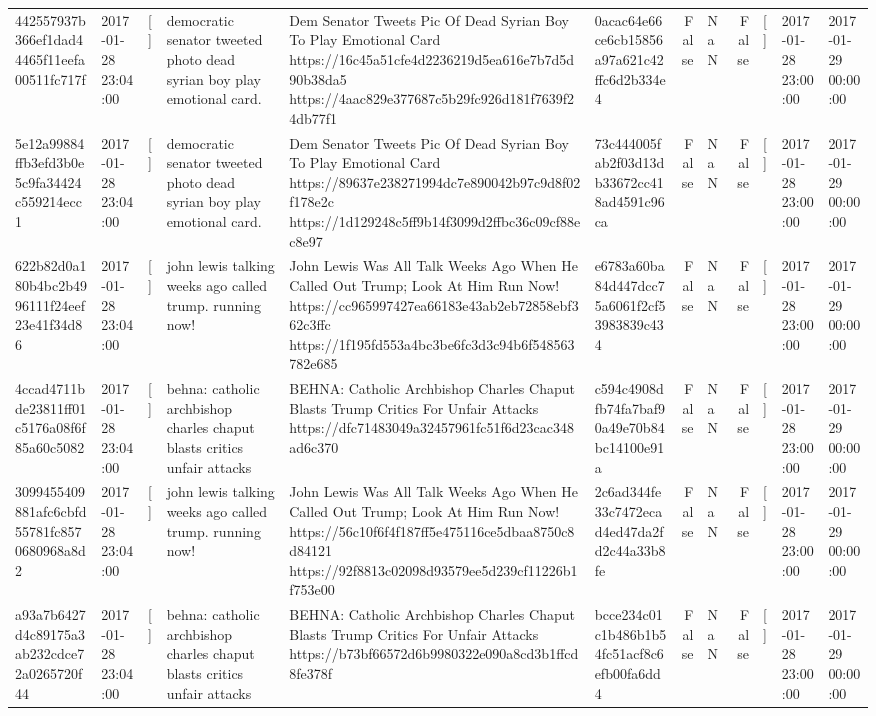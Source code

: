 \begin{tabular}{llllllrlrlll}
442557937b366ef1dad44465f11eefa00511fc717f & 2017-01-28 23:04:00 & [] & democratic senator tweeted photo dead syrian boy play emotional card. & Dem Senator Tweets Pic Of Dead Syrian Boy To Play Emotional Card https://16c45a51cfe4d2236219d5ea616e7b7d5d90b38da5 https://4aac829e377687c5b29fc926d181f7639f24db77f1 & 0acac64e66ce6cb15856a97a621c42ffc6d2b334e4 & False & NaN & False & [] & 2017-01-28 23:00:00 & 2017-01-29 00:00:00 \\
5e12a99884ffb3efd3b0e5c9fa34424c559214ecc1 & 2017-01-28 23:04:00 & [] & democratic senator tweeted photo dead syrian boy play emotional card. & Dem Senator Tweets Pic Of Dead Syrian Boy To Play Emotional Card https://89637e238271994dc7e890042b97c9d8f02f178e2c https://1d129248c5ff9b14f3099d2ffbc36c09cf88ec8e97 & 73c444005fab2f03d13db33672cc418ad4591c96ca & False & NaN & False & [] & 2017-01-28 23:00:00 & 2017-01-29 00:00:00 \\
622b82d0a180b4bc2b4996111f24eef23e41f34d86 & 2017-01-28 23:04:00 & [] & john lewis talking weeks ago called trump. running now! & John Lewis Was All Talk Weeks Ago When He Called Out Trump; Look At Him Run Now! https://cc965997427ea66183e43ab2eb72858ebf362c3ffc https://1f195fd553a4bc3be6fc3d3c94b6f548563782e685 & e6783a60ba84d447dcc75a6061f2cf53983839c434 & False & NaN & False & [] & 2017-01-28 23:00:00 & 2017-01-29 00:00:00 \\
4ccad4711bde23811ff01c5176a08f6f85a60c5082 & 2017-01-28 23:04:00 & [] & behna: catholic archbishop charles chaput blasts critics unfair attacks & BEHNA: Catholic Archbishop Charles Chaput Blasts Trump Critics For Unfair Attacks https://dfc71483049a32457961fc51f6d23cac348ad6c370 & c594c4908dfb74fa7baf90a49e70b84bc14100e91a & False & NaN & False & [] & 2017-01-28 23:00:00 & 2017-01-29 00:00:00 \\
3099455409881afc6cbfd55781fc8570680968a8d2 & 2017-01-28 23:04:00 & [] & john lewis talking weeks ago called trump. running now! & John Lewis Was All Talk Weeks Ago When He Called Out Trump; Look At Him Run Now! https://56c10f6f4f187ff5e475116ce5dbaa8750c8d84121 https://92f8813c02098d93579ee5d239cf11226b1f753e00 & 2c6ad344fe33c7472ecad4ed47da2fd2c44a33b8fe & False & NaN & False & [] & 2017-01-28 23:00:00 & 2017-01-29 00:00:00 \\
a93a7b6427d4c89175a3ab232cdce72a0265720f44 & 2017-01-28 23:04:00 & [] & behna: catholic archbishop charles chaput blasts critics unfair attacks & BEHNA: Catholic Archbishop Charles Chaput Blasts Trump Critics For Unfair Attacks https://b73bf66572d6b9980322e090a8cd3b1ffcd8fe378f & bcce234c01c1b486b1b54fc51acf8c6efb00fa6dd4 & False & NaN & False & [] & 2017-01-28 23:00:00 & 2017-01-29 00:00:00 \\

\end{tabular}
